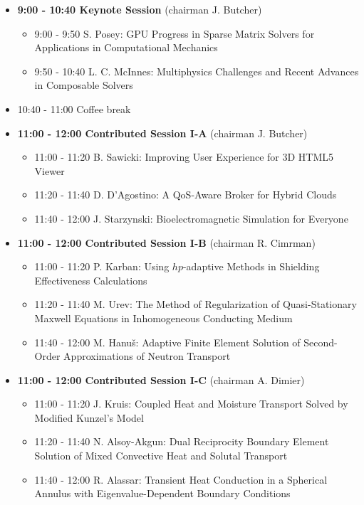 \documentclass[10pt, A4]{article}%
\begin{document}
\begin{itemize}    
  \item {\bf 9:00 - 10:40 Keynote Session} (chairman J. Butcher) 
  \begin{itemize}
    \item 9:00 - 9:50 S. Posey: GPU Progress in Sparse Matrix Solvers for Applications in Computational Mechanics
    \item 9:50 - 10:40 L. C. McInnes: Multiphysics Challenges and Recent Advances in Composable Solvers
  \end{itemize}
  \item 10:40 - 11:00 Coffee break
  \item {\bf 11:00 - 12:00 Contributed Session I-A} (chairman J. Butcher) 
  \begin{itemize}
    \item 11:00 - 11:20 B. Sawicki: Improving User Experience for 3D HTML5 Viewer
    \item 11:20 - 11:40 D. D’Agostino: A QoS-Aware Broker for Hybrid Clouds
    \item 11:40 - 12:00 J. Starzynski: Bioelectromagnetic Simulation for Everyone 
  \end{itemize}
  \item {\bf 11:00 - 12:00 Contributed Session I-B} (chairman R. Cimrman) 
  \begin{itemize}
    \item 11:00 - 11:20 P. Karban: Using $hp$-adaptive Methods in Shielding Effectiveness Calculations 
    \item 11:20 - 11:40 M. Urev: The Method of Regularization of Quasi-Stationary Maxwell Equations in Inhomogeneous Conducting Medium
    \item 11:40 - 12:00 M. Hanu\v{s}: Adaptive Finite Element Solution of Second-Order Approximations of Neutron Transport
  \end{itemize}
  \item {\bf 11:00 - 12:00 Contributed Session I-C} (chairman A. Dimier) 
  \begin{itemize}
    \item 11:00 - 11:20 J. Kruis: Coupled Heat and Moisture Transport Solved by Modified Kunzel’s Model  
    \item 11:20 - 11:40 N. Alsoy-Akgun: Dual Reciprocity Boundary Element Solution of Mixed Convective Heat and Solutal Transport 
    \item 11:40 - 12:00 R. Alassar: Transient Heat Conduction in a Spherical Annulus with Eigenvalue-Dependent Boundary Conditions

\end{itemize}
\end{itemize}
\end{document}
